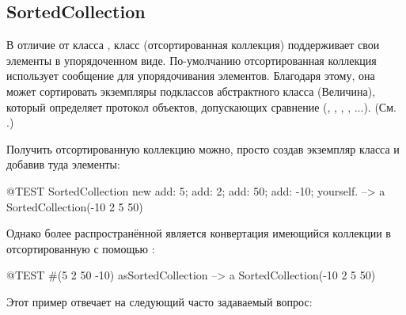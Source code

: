 \documentclass[a4paper,10pt,twoside]{book}
\begin{document}
\subsection{SortedCollection}
В отличие от класса , класс  (отсортированная коллекция) поддерживает свои элементы в упорядоченном виде. По-умолчанию отсортированная коллекция использует сообщение  для упорядочивания элементов. Благодаря этому, она может сортировать экземпляры подклассов абстрактного класса  (Величина), который определяет протокол объектов, допускающих сравнение (, , , , ...). 
(См. .)

Получить отсортированную коллекцию можно, просто создав экземпляр класса  и добавив туда элементы:
\begin{code}{@TEST}
SortedCollection new add: 5; add: 2; add: 50; add: -10; yourself. --> a SortedCollection(-10 2 5 50)
\end{code}

\noindent
Однако более распространённой является конвертация имеющийся коллекции в отсортированную с помощью :
\begin{code}{@TEST}
#(5 2 50 -10) asSortedCollection --> a SortedCollection(-10 2 5 50)
\end{code}

Этот пример отвечает на следующий часто задаваемый вопрос:

\important{Вопрос: Как мне отсортировать коллекцию?\\
{\sc Ответ}: Пошлите ей сообщение \ct{asSortedCollection}.}
\end{document}
